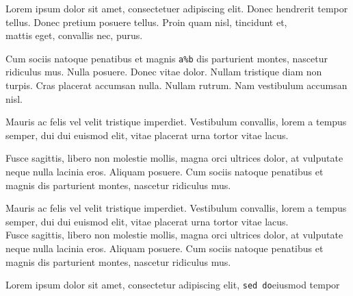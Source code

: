 Lorem ipsum dolor sit amet, consectetuer adipiscing elit. Donec hendrerit
tempor tellus. Donec pretium posuere tellus. Proin quam nisl, tincidunt et,
 \\%
mattis eget, convallis nec, purus.

Cum sociis natoque penatibus et magnis \verb|a%b|
dis parturient montes, nascetur ridiculus mus. Nulla posuere. Donec vitae
dolor. Nullam tristique diam non turpis. 
Cras placerat accumsan nulla. Nullam rutrum. Nam vestibulum accumsan nisl.

Mauris ac felis vel velit tristique imperdiet.  Vestibulum convallis, lorem a tempus semper, dui dui euismod elit, vitae placerat urna tortor vitae lacus.\par 
 Fusce sagittis, libero non molestie mollis, magna orci ultrices dolor, at vulputate neque nulla lacinia eros.  Aliquam posuere.  Cum sociis natoque penatibus et magnis dis parturient montes, nascetur ridiculus mus.%

Mauris ac felis vel velit tristique imperdiet.  Vestibulum convallis, lorem a 
tempus semper, dui dui euismod elit, vitae placerat urna tortor vitae lacus.\\
  Fusce sagittis, libero non molestie mollis, magna orci ultrices dolor, at vulputate neque nulla lacinia eros.  Aliquam posuere.  Cum sociis natoque penatibus et magnis dis parturient montes, nascetur ridiculus mus.%

Lorem ipsum dolor sit amet, consectetur adipiscing elit, \verb|sed do|eiusmod tempor
